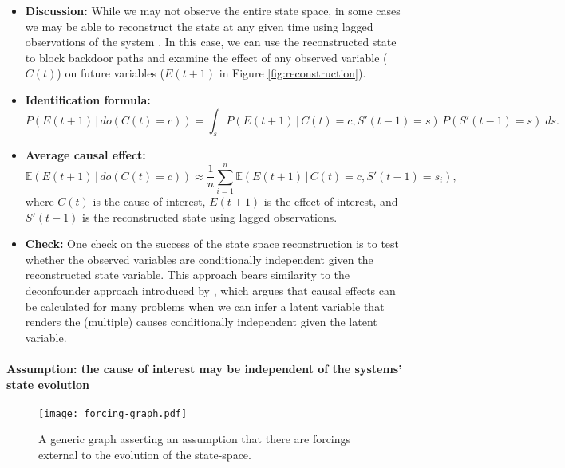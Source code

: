 \documentclass[12pt]{article}
\begin{document}
\begin{itemize}
\item \textbf{Discussion:} While we may not observe the entire state
  space, in some cases we may be able to reconstruct the state at any
  given time using lagged observations of the system \citep[see
  Takens' theorem,][]{takens1981detecting}. In this case, we can use
  the reconstructed state to block backdoor paths and examine the
  effect of any observed variable ($C(t)$) on future variables
  ($E(t+1)$ in Figure \ref{fig:reconstruction}).
\item \textbf{Identification formula:}
  \begin{equation*}
    P(E(t+1) \, | \, do(C(t) = c)) = \int_{s} P(E(t+1) \, | \, C(t) = c,
    S'(t-1) = s) \, P(S'(t-1)=s) \; d s.
  \end{equation*}
\item \textbf{Average causal effect:}
  \begin{equation*}
    \mathbb{E}(E(t+1) \, | \, do(C(t) = c)) \approx \frac{1}{n}
    \sum_{i=1}^n \mathbb{E}(E(t+1) \, | \, C(t)=c, S'(t-1)=s_i),
  \end{equation*}
  where $C(t)$ is the cause of interest, $E(t+1)$ is the effect of
  interest, and $S'(t-1)$ is the reconstructed state using lagged
  observations.
\item \textbf{Check:} One check on the success of the state space
  reconstruction is to test whether the observed variables are
  conditionally independent given the reconstructed state
  variable. This approach bears similarity to the deconfounder
  approach introduced by \cite{yixin-2019}, which argues that causal
  effects can be calculated for many problems when we can infer a
  latent variable that renders the (multiple) causes conditionally
  independent given the latent variable.
\end{itemize}

\newpage

\paragraph{Assumption: the cause of interest may be independent of the
  systems' state evolution}

\begin{figure} \texttt{[image: forcing-graph.pdf]}
  \centering
  \caption{A generic graph asserting an assumption that there are
    forcings external to the evolution of the state-space.}
  \label{fig:forcing}
\end{figure}
\end{document}
